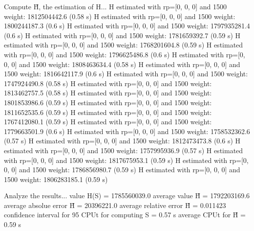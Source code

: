 Compute H̃, the estimation of H...
  H estimated with rp=[0, 0, 0] and 1500 weight:  1812504442.6  (0.58 s)
  H estimated with rp=[0, 0, 0] and 1500 weight:  1800244187.3  (0.6 s)
  H estimated with rp=[0, 0, 0] and 1500 weight:  1797935281.4  (0.6 s)
  H estimated with rp=[0, 0, 0] and 1500 weight:  1781659392.7  (0.59 s)
  H estimated with rp=[0, 0, 0] and 1500 weight:  1768201604.8  (0.59 s)
  H estimated with rp=[0, 0, 0] and 1500 weight:  1796625486.8  (0.6 s)
  H estimated with rp=[0, 0, 0] and 1500 weight:  1808463634.4  (0.58 s)
  H estimated with rp=[0, 0, 0] and 1500 weight:  1816642117.9  (0.6 s)
  H estimated with rp=[0, 0, 0] and 1500 weight:  1747924490.8  (0.58 s)
  H estimated with rp=[0, 0, 0] and 1500 weight:  1813462757.5  (0.58 s)
  H estimated with rp=[0, 0, 0] and 1500 weight:  1801853986.6  (0.59 s)
  H estimated with rp=[0, 0, 0] and 1500 weight:  1811652535.6  (0.59 s)
  H estimated with rp=[0, 0, 0] and 1500 weight:  1767412080.1  (0.59 s)
  H estimated with rp=[0, 0, 0] and 1500 weight:  1779663501.9  (0.6 s)
  H estimated with rp=[0, 0, 0] and 1500 weight:  1758532362.6  (0.57 s)
  H estimated with rp=[0, 0, 0] and 1500 weight:  1812473473.8  (0.6 s)
  H estimated with rp=[0, 0, 0] and 1500 weight:  1757995936.9  (0.57 s)
  H estimated with rp=[0, 0, 0] and 1500 weight:  1817675953.1  (0.59 s)
  H estimated with rp=[0, 0, 0] and 1500 weight:  1786856980.7  (0.59 s)
  H estimated with rp=[0, 0, 0] and 1500 weight:  1806283185.1  (0.59 s)

Analyze the results...
  value H(S)                  = 1785560039.0 
  average value H̃             = 1792203169.6 
  average absolue error H̃     = 20396221.0 
  average relative error H̃    = 0.011423 
  confidence interval for 95%
  CPUt for computing S         = 0.57 s
  average CPUt for H̃           = 0.59 s

